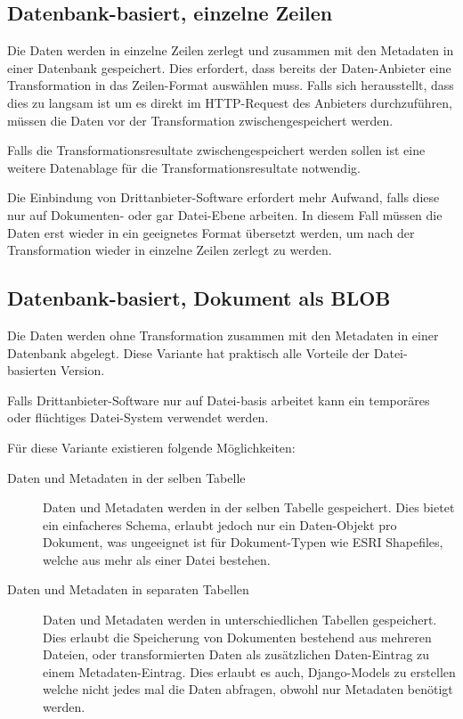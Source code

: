 \subsection{Datenbank-basiert, einzelne Zeilen}\label{sec:pd:datenbank-records}
Die Daten werden in einzelne Zeilen zerlegt und zusammen mit den Metadaten in einer Datenbank gespeichert. Dies erfordert, dass bereits der Daten-Anbieter eine Transformation in das Zeilen-Format auswählen muss. Falls sich herausstellt, dass dies zu langsam ist um es direkt im HTTP-Request des Anbieters durchzuführen, müssen die Daten vor der Transformation zwischengespeichert werden.

Falls die Transformationsresultate zwischengespeichert werden sollen ist eine weitere Datenablage für die Transformationsresultate notwendig.

Die Einbindung von Drittanbieter-Software erfordert mehr Aufwand, falls diese nur auf Dokumenten- oder gar Datei-Ebene arbeiten. In diesem Fall müssen die Daten erst wieder in ein geeignetes Format übersetzt werden, um nach der Transformation wieder in einzelne Zeilen zerlegt zu werden.

\subsection{Datenbank-basiert, Dokument als BLOB}
Die Daten werden ohne Transformation zusammen mit den Metadaten in einer Datenbank abgelegt. Diese Variante hat praktisch alle Vorteile der Datei-basierten Version.

Falls Drittanbieter-Software nur auf Datei-basis arbeitet kann ein temporäres oder flüchtiges Datei-System verwendet werden.

Für diese Variante existieren folgende Möglichkeiten:
\begin{description}
\item[Daten und Metadaten in der selben Tabelle] Daten und Metadaten werden in der selben Tabelle gespeichert. Dies bietet ein einfacheres Schema, erlaubt jedoch nur ein Daten-Objekt pro Dokument, was ungeeignet ist für Dokument-Typen wie ESRI Shapefiles, welche aus mehr als einer Datei bestehen.
\item[Daten und Metadaten in separaten Tabellen] Daten und Metadaten werden in unterschiedlichen Tabellen gespeichert. Dies erlaubt die Speicherung von Dokumenten bestehend aus mehreren Dateien, oder transformierten Daten als zusätzlichen Daten-Eintrag zu einem Metadaten-Eintrag. Dies erlaubt es auch, Django-Models zu erstellen welche nicht jedes mal die Daten abfragen, obwohl nur Metadaten benötigt werden.
\end{description}

